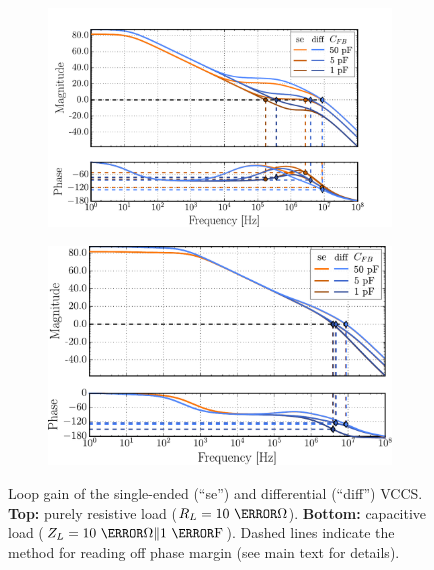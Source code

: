 \documentclass[10pt]{article}
\begin{document}
\begin{figure}[t!]
	\begin{subfigure}{\textwidth}
        \centering
		\includegraphics[scale=.6]{sim_phase_margins_resistive.pdf}
        \label{fig:phase_margins_resistive_load}
    \end{subfigure}

	\begin{subfigure}{\textwidth}
        \centering
		\includegraphics[scale=.6]{sim_phase_margins_capacitive.pdf}
        \label{fig:phase_margins_capacitive_load}
    \end{subfigure}

    \caption{\small Loop gain of the single-ended (``se'') and differential (``diff'') VCCS. \textbf{Top:} purely resistive load ($R_L=10~\kilo\ohm$). \textbf{Bottom:} capacitive load ($Z_L=10~\kilo\ohm\|1~\micro\farad$). Dashed lines indicate the method for reading off phase margin (see main text for details).}
    \label{fig:loop_gains_phase_margins}
\end{figure}
\end{document}
